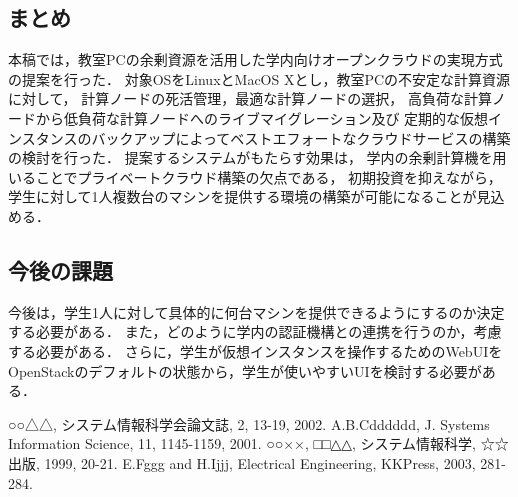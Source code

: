 \documentclass[11pt,a4paper]{jsarticle}
\begin{document}
\subsection{まとめ}
本稿では，教室PCの余剰資源を活用した学内向けオープンクラウドの実現方式の提案を行った．
対象OSをLinuxとMacOS Xとし，教室PCの不安定な計算資源に対して，
計算ノードの死活管理，最適な計算ノードの選択，
高負荷な計算ノードから低負荷な計算ノードへのライブマイグレーション及び
定期的な仮想インスタンスのバックアップによってベストエフォートなクラウドサービスの構築の検討を行った．
提案するシステムがもたらす効果は，
学内の余剰計算機を用いることでプライベートクラウド構築の欠点である，
初期投資を抑えながら，学生に対して1人複数台のマシンを提供する環境の構築が可能になることが見込める．
\subsection{今後の課題}
今後は，学生1人に対して具体的に何台マシンを提供できるようにするのか決定する必要がある．
また，どのように学内の認証機構との連携を行うのか，考慮する必要がある．
さらに，学生が仮想インスタンスを操作するためのWebUIをOpenStackのデフォルトの状態から，学生が使いやすいUIを検討する必要がある．

\begin{thebibliography}{99}
	○○△△, システム情報科学会論文誌, 2, 13-19, 2002.
	A.B.Cdddddd, J. Systems Information Science, 11, 1145-1159, 2001.
	○○××, □□△△, システム情報科学, ☆☆出版, 1999, 20-21.
	E.Fggg and H.Ijjj, Electrical Engineering, KKPress, 2003, 281-284.
\end{thebibliography}
\end{document}
